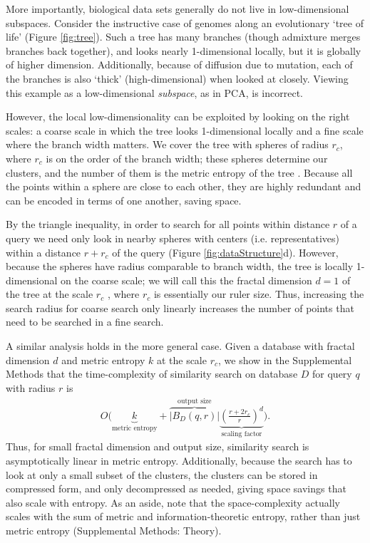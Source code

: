 \documentclass[review,preprint,12pt]{elsarticle}
\renewcommand{\cite}{\citep} %
\theoremstyle{definition}
\theoremstyle{remark}
\numberwithin{equation}{section}
\begin{document}
More importantly, biological data sets generally do not live in low-dimensional subspaces.
Consider the instructive case of genomes along an evolutionary `tree of life' (Figure \ref{fig:tree}).
Such a tree has many branches (though admixture merges branches back together),
and looks nearly 1-dimensional locally, but it is globally of higher dimension.
Additionally, because of diffusion due to mutation, each of the branches is also `thick' (high-dimensional) when looked at closely.
Viewing this example as a low-dimensional \textit{subspace}, as in PCA, is 
incorrect.

However, the local low-dimensionality can be exploited by looking on the right scales: a coarse scale in which the tree looks 1-dimensional locally and a fine scale where the branch width matters.
We cover the tree with spheres of radius $r_c$, where $r_c$ is on the order of the branch width; these spheres determine our clusters, and the number of them is the metric entropy of the tree \cite{tao2008product}.
Because all the points within a sphere are close to each other, they are highly 
redundant and can be encoded in terms of one another, saving space.

By the triangle inequality, in order to search for all points within distance $r$ of a query we need only look in nearby spheres with centers (i.e. representatives) within a distance $r+r_c$ of the query (Figure \ref{fig:dataStructure}d).
However, because the spheres have radius comparable to branch width, the tree is locally 1-dimensional on the coarse scale; we will call this the fractal dimension $d=1$ of the tree at the scale $r_c$ \cite{falconer1990fractal}, where $r_c$ is essentially our ruler size.
Thus, increasing the search radius for coarse search only linearly increases the number of points that need to be searched in a fine search.

A similar analysis holds in the more general case.
Given a database with fractal dimension $d$ and metric entropy $k$ at the scale $r_c$, we show in the Supplemental Methods that the time-complexity of similarity search on database $D$ for query $q$ with radius $r$ is
\begin{gather*}
    O\Bigg(
    \underbrace{k}_{\textrm{metric entropy}} +
    \overbrace{\left|B_D(q,r)\right|}^{\textrm{output size}}
    \underbrace{\left(\frac{r+2r_c}{r}\right)^d}_{\textrm{scaling factor}}
     \Bigg) .
\end{gather*}
Thus, for small fractal dimension and output size, similarity search is asymptotically linear in metric entropy.
Additionally, because the search has to look at only a small subset of the clusters, the clusters can be stored in compressed form, and only decompressed as needed, giving space savings that also scale with entropy.
As an aside, note that the space-complexity actually scales with the sum of metric and information-theoretic entropy, rather than just metric entropy 
(Supplemental Methods: Theory).
\end{document}
